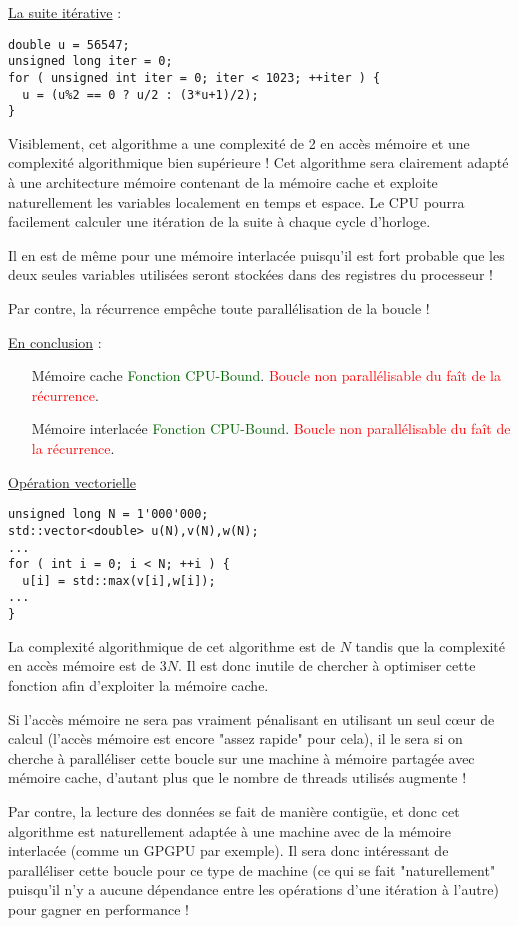 \documentclass[fleqn,11pt]{article}
\begin{document}
\underline{La suite itérative} :

\begin{lstlisting}
double u = 56547;
unsigned long iter = 0;
for ( unsigned int iter = 0; iter < 1023; ++iter ) {
  u = (u%2 == 0 ? u/2 : (3*u+1)/2);
}
\end{lstlisting}

Visiblement, cet algorithme a une complexité de 2 en accès mémoire et une complexité algorithmique bien supérieure ! Cet algorithme sera clairement adapté à une architecture mémoire contenant de la mémoire cache
et exploite naturellement les variables  localement en temps et espace. Le CPU pourra facilement calculer une itération de la suite à chaque cycle d'horloge. 

Il en est de même pour une mémoire interlacée puisqu'il est fort probable que les deux seules variables utilisées seront stockées dans des registres du processeur !

Par contre, la récurrence empêche toute parallélisation de la boucle !

\underline{En conclusion} :
\begin{itemize}
\item [Mémoire cache] \textcolor{darkgreen}{Fonction CPU-Bound}. \textcolor{red}{Boucle non parallélisable du faît de la récurrence}.
\item [Mémoire interlacée] \textcolor{darkgreen}{Fonction CPU-Bound}. \textcolor{red}{Boucle non parallélisable du faît de la récurrence}.
\end{itemize}

\underline{Opération vectorielle}

\begin{lstlisting}
unsigned long N = 1'000'000;
std::vector<double> u(N),v(N),w(N);
...
for ( int i = 0; i < N; ++i ) {
  u[i] = std::max(v[i],w[i]);
...
}
\end{lstlisting}

La complexité algorithmique de cet algorithme est de $N$ tandis que la complexité en accès mémoire
est de $3N$. Il est donc inutile de chercher à optimiser cette fonction afin d'exploiter la mémoire cache.

Si l'accès mémoire ne sera pas vraiment pénalisant en utilisant un seul c{\oe}ur de calcul (l'accès mémoire est encore "assez rapide" pour cela), il le sera si on cherche à paralléliser cette boucle sur une machine à mémoire partagée avec mémoire cache, d'autant plus que le nombre de threads utilisés augmente !

Par contre, la lecture des données se fait de manière contigüe, et donc cet algorithme est naturellement
adaptée à une machine avec de la mémoire interlacée (comme un GPGPU par exemple). Il sera donc intéressant
de paralléliser cette boucle pour ce type de machine (ce qui se fait "naturellement" puisqu'il n'y a aucune
dépendance entre les opérations d'une itération à l'autre) pour gagner en performance !
\end{document}
